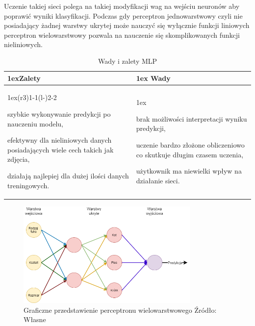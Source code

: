 Uczenie takiej sieci polega na takiej modyfikacji wag na wejściu neuronów aby poprawić
wyniki klasyfikacji. Podczas gdy perceptron jednowarstwowy czyli nie posiadający żadnej warstwy ukrytej może 
nauczyć się wyłącznie funkcji liniowych perceptron wielowarstwowy pozwala na nauczenie
się skomplikowanych funkcji nieliniowych.

\begin{table}[h]
    \begin{tabularx}{\linewidth}{>{\parskip1ex}X@{\kern4\tabcolsep}>{\parskip1ex}X}
    \toprule
    \hfil\bfseries Zalety
    &
    \hfil\bfseries Wady
    \\\cmidrule(r{3\tabcolsep}){1-1}\cmidrule(l{-\tabcolsep}){2-2}
    
    szybkie wykonywanie predykcji po nauczeniu modelu,\par
    efektywny dla nieliniowych danych posiadających wiele cech takich jak zdjęcia,\par
    działają najlepiej dla dużej ilości danych treningowych.\par
    &
    
    brak możliwości interpretacji wyniku predykcji,\par
    uczenie bardzo złożone obliczeniowo co skutkuje długim czasem uczenia,\par
    użytkownik ma niewielki wpływ na działanie sieci.\par
    \\\bottomrule
    \end{tabularx}
    \caption{Wady i zalety MLP}
\end{table}

\begin{figure}[h]
    \centering
    \includegraphics[width=0.8\textwidth]{./Img/MLP.png}
    \caption{Graficzne przedstawienie perceptronu wielowarstwowego Źródło: Własne}
\end{figure}

